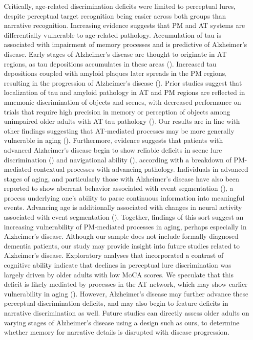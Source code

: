 \documentclass[11pt]{article}
\begin{document}
Critically, age-related discrimination deficits were limited to perceptual lures, despite perceptual target recognition being easier across both groups than narrative recognition. Increasing evidence suggests that PM and AT systems are differentially vulnerable to age-related pathology. Accumulation of tau is associated with impairment of memory processes and is predictive of Alzheimer’s disease. Early stages of Alzheimer’s disease are thought to originate in AT regions, as tau depositions accumulates in these areas (\cite{braak_frequency_nodate}). Increased tau depositions coupled with amyloid plaques later spreads in the PM regions, resulting in the progression of Alzheimer’s disease (\cite{jagust_imaging_2018, leal_subthreshold_2018}). Prior studies suggest that localization of tau and amyloid pathology in AT and PM regions are reflected in mnemonic discrimination of objects and scenes, with decreased performance on trials that require high precision in memory or perception of objects among unimpaired older adults with AT tau pathology (\cite{maass_alzheimers_2019}). Our results are in line with other findings suggesting that AT-mediated processes may be more generally vulnerable in aging (\cite{reagh_greater_2016, reagh_functional_2018}). Furthermore, evidence suggests that patients with advanced Alzheimer’s disease begin to show reliable deficits in scene lure discrimination (\cite{maass_alzheimers_2019}) and navigational ability (\cite{allison_spatial_2016}), according with a breakdown of PM-mediated contextual processes with advancing pathology. Individuals in advanced stages of aging, and particularly those with Alzheimer’s disease have also been reported to show aberrant behavior associated with event segmentation (\cite{zacks_event_2006}), a process underlying one’s ability to parse continuous information into meaningful events. Advancing age is additionally associated with changes in neural activity associated with event segmentation (\cite{reagh_aging_2020}). Together, findings of this sort suggest an increasing vulnerability of PM-mediated processes in aging, perhaps especially in Alzheimer’s disease. Although our sample does not include formally diagnosed dementia patients, our study may provide insight into future studies related to Alzheimer’s disease. Exploratory analyses that incorporated a contrast of cognitive ability indicate that declines in perceptual lure discrimination was largely driven by older adults with low MoCA scores. We speculate that this deficit is likely mediated by processes in the AT network, which may show earlier vulnerability in aging (\cite{maass_alzheimers_2019, reagh_functional_2018}). However, Alzheimer’s disease may further advance these perceptual discrimination deficits, and may also begin to feature deficits in narrative discrimination as well. Future studies can directly assess older adults on varying stages of Alzheimer’s disease using a design such as ours, to determine whether memory for narrative details is disrupted with disease progression. 
\end{document}
